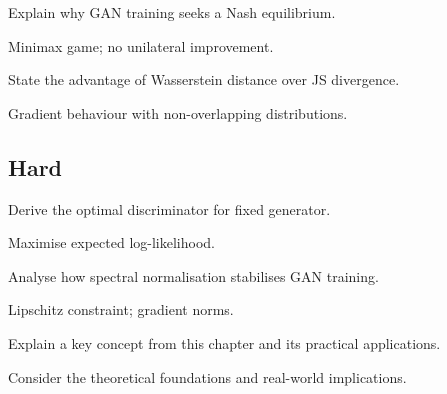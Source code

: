\begin{exercisebox}[medium]
\begin{problem}
Explain why GAN training seeks a Nash equilibrium.
\end{problem}
\begin{hintbox}
Minimax game; no unilateral improvement.
\end{hintbox}
\end{exercisebox}


\begin{exercisebox}[medium]
\begin{problem}
State the advantage of Wasserstein distance over JS divergence.
\end{problem}
\begin{hintbox}
Gradient behaviour with non-overlapping distributions.
\end{hintbox}
\end{exercisebox}


\subsection*{Hard}

\begin{exercisebox}[hard]
\begin{problem}
Derive the optimal discriminator for fixed generator.
\end{problem}
\begin{hintbox}
Maximise expected log-likelihood.
\end{hintbox}
\end{exercisebox}


\begin{exercisebox}[hard]
\begin{problem}
Analyse how spectral normalisation stabilises GAN training.
\end{problem}
\begin{hintbox}
Lipschitz constraint; gradient norms.
\end{hintbox}
\end{exercisebox}



\begin{exercisebox}[hard]
\begin{problem}
Explain a key concept from this chapter and its practical applications.
\end{problem}
\begin{hintbox}
Consider the theoretical foundations and real-world implications.
\end{hintbox}
\end{exercisebox}


